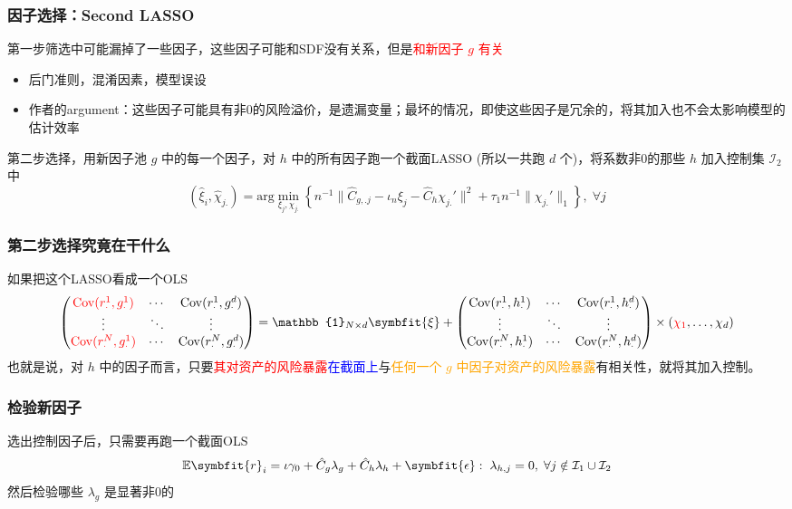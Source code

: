 \documentclass[
  UTF8,
  xcolor={dvipsnames,rgb},
  hyperref={colorlinks, citecolor=orange, linkcolor=black},
  aspectratio=169
  ]{beamer}
\begin{document}
\begin{frame}
    \frametitle{因子选择：Second LASSO}
    第一步筛选中可能漏掉了一些因子，这些因子可能和SDF没有关系，但是\textcolor{red}{和新因子 \(g\) 有关}
    \begin{itemize}
        \item 后门准则，混淆因素，模型误设
        \item 作者的argument：这些因子可能具有非0的风险溢价，是遗漏变量；最坏的情况，即使这些因子是冗余的，将其加入也不会太影响模型的估计效率
    \end{itemize}
    第二步选择，用新因子池 \(g\) 中的每一个因子，对 \(h\) 中的所有因子跑一个截面LASSO (所以一共跑 \(d\) 个)，将系数非0的那些 \(h\) 加入控制集 \(\mathcal{I}_2\) 中
    \[(\hat{\xi}_{i},\hat{\chi}_{j.}) = \textrm{arg} \min_{\xi_{j},\chi_{j.}} \left\{ n^{-1}\lVert \hat{C}_{g,.j}-\iota_{n}\xi_{j}-\hat{C}_{h}\chi_{j.}' \rVert^{2} + \tau_{1}n^{-1}\lVert \chi_{j.}' \rVert_{1}  \right\} , \; \forall j\]
\end{frame}

\begin{frame}
    \frametitle{第二步选择究竟在干什么}
    如果把这个LASSO看成一个OLS
    {\small
        \[
        \begin{pmatrix}
            \textcolor{red}{\mathrm{Cov}(r_{\cdot}^{1},g_{\cdot}^{1})} & \cdots & \mathrm{Cov}(r_{\cdot}^{1},g_{\cdot}^{d}) \\
            \vdots & \ddots & \vdots \\
            \textcolor{red}{\mathrm{Cov}(r_{\cdot}^{N},g_{\cdot}^{1})} & \cdots & \mathrm{Cov}(r_{\cdot}^{N},g_{\cdot}^{d})
            \end{pmatrix}=\mathbb{1}_{N\times d} \symbfit{\xi} + \begin{pmatrix}
            \mathrm{Cov}(r_{\cdot}^{1},h_{\cdot}^{1}) & \cdots & \mathrm{Cov}(r_{\cdot}^{1},h_{\cdot}^{d}) \\
            \vdots & \ddots & \vdots \\
            \mathrm{Cov}(r_{\cdot}^{N},h_{\cdot}^{1}) & \cdots & \mathrm{Cov}(r_{\cdot}^{N},h_{\cdot}^{d})
            \end{pmatrix}\times (\textcolor{red}{\chi_{1}},\dots,\chi_{d})
        \]
    }
    也就是说，对 \(h\) 中的因子而言，只要\textcolor{red}{其对资产的风险暴露}\textcolor{blue}{在截面上}与\textcolor{orange}{任何一个 \(g\) 中因子对资产的风险暴露}有相关性，就将其加入控制。
\end{frame}

\begin{frame}
    \frametitle{检验新因子}

    选出控制因子后，只需要再跑一个截面OLS
    \[
        \mathbb{E}\symbfit{r}_{i}=\iota \gamma_{0}+\hat{C}_{g}\lambda_{g}+\hat{C}_{h}\lambda_{h}+\symbfit{\epsilon}: \; \lambda_{h,j}=0, \; \forall j \notin \mathcal{I}_1 \cup \mathcal{I}_2
    \]
    然后检验哪些 \(\lambda_g\) 是显著非0的

\end{frame}
\end{document}

